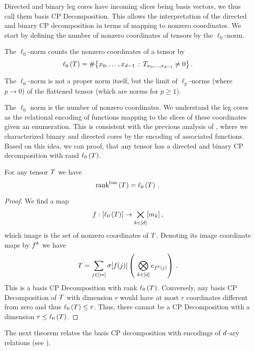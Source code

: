 Directed and binary leg cores have incoming slices being basis vectors, we thus call them basis CP Decomposition.
This allows the interpretation of the directed and binary CP decomposition in terms of mapping to nonzero coordinates.
We start by defining the number of nonzero coordinates of tensors by the $\ell_0$-norm.

\begin{definition}
	The $\ell_0$-norm counts the nonzero coordinates of a tensor by
		\[ \ell_0\left(T\right) = \#\big\{ x_{0},\ldots,x_{d-1} \, : \, T_{x_{0},\ldots,x_{d-1} }\neq 0 \big\} \, . \]
\end{definition}

The $\ell_0$-norm is not a proper norm itself, but the limit of $\ell_p$-norms (where $p \rightarrow 0$) of the flattened tensor (which are norms for $p\geq1$).

The $\ell_0$ norm is the number of nonzero coordinates. 
We understand the leg cores as the relational encoding of functions mapping to the slices of these coordinates given an enumeration.
This is consistent with the previous analysis of , where we characterized binary and directed cores by the encoding of associated functions.
Based on this idea, we can proof, that any tensor has a directed and binary CP decomposition with rand $\ell_0\left(T\right)$.


\begin{theorem}\label{the:sparseBasisCP}
	For any tensor $T$ we have
		\[ \mathrm{rank}^{\mathrm{bas}}\left(T\right) = \ell_0\left(T\right) \, .  \]	
\end{theorem}
\begin{proof}
	We find a map 
		\[ f : [\ell_0\left(T\right)] \rightarrow  \bigtimes_{k\in[d]}[m_{k}] \, , \] 
	which image is the set of nonzero coordinates of $T$.
	Denoting its image coordinate maps by $f^{k}$ we have
		\[ \hypercore = \sum_{\datindexin} \scalarcoreof{\exfunction(\datindex)} \left( \bigotimes_{\atomenumeratorin} \onehotmapof{\exfunction^\atomenumerator(\datindex)} \right) \, . \]
	This is a basis CP Decomposition with rank $\ell_0\left(T\right)$.
	Conversely, any basis CP Decomposition of $T$ with dimension $r$ would have at most $r$ coordinates different from zero and thus $\ell_0\left(T\right)\leq r$.
	Thus, there cannot be a CP Decomposition with a dimension $r\leq\ell_0\left(T\right)$.
\end{proof}

%
The next theorem relates the basis CP decomposition with encodings of $d$-ary relations (see ).

